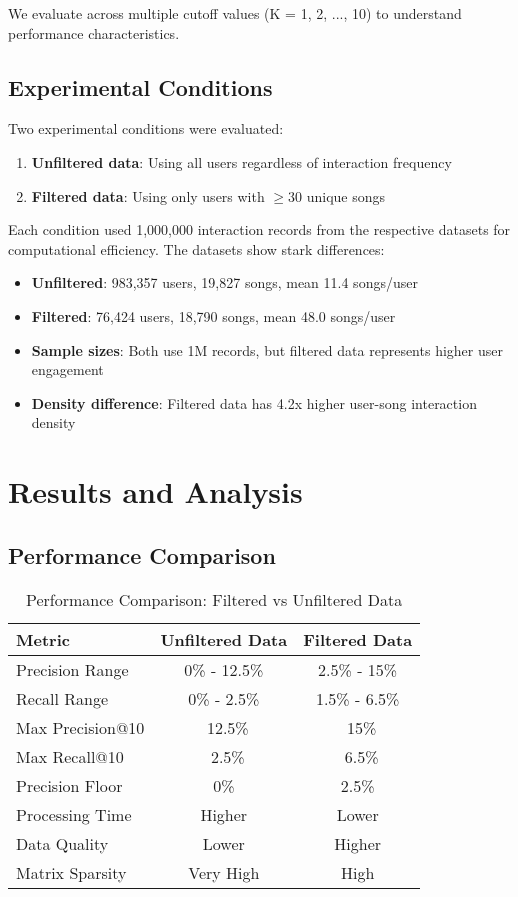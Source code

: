 \documentclass[12pt,a4paper]{article}
\begin{document}
We evaluate across multiple cutoff values (K = 1, 2, ..., 10) to understand performance characteristics.

\subsection{Experimental Conditions}
Two experimental conditions were evaluated:
\begin{enumerate}
    \item \textbf{Unfiltered data}: Using all users regardless of interaction frequency
    \item \textbf{Filtered data}: Using only users with $\geq 30$ unique songs
\end{enumerate}

Each condition used 1,000,000 interaction records from the respective datasets for computational efficiency. The datasets show stark differences:

\begin{itemize}
    \item \textbf{Unfiltered}: 983,357 users, 19,827 songs, mean 11.4 songs/user
    \item \textbf{Filtered}: 76,424 users, 18,790 songs, mean 48.0 songs/user
    \item \textbf{Sample sizes}: Both use 1M records, but filtered data represents higher user engagement
    \item \textbf{Density difference}: Filtered data has 4.2x higher user-song interaction density
\end{itemize}

\section{Results and Analysis}

\subsection{Performance Comparison}

\begin{table}[H]
\centering
\caption{Performance Comparison: Filtered vs Unfiltered Data}
\begin{tabular}{lcc}
\toprule
Metric & Unfiltered Data & Filtered Data \\
\midrule
Precision Range & 0\% - 12.5\% & 2.5\% - 15\% \\
Recall Range & 0\% - 2.5\% & 1.5\% - 6.5\% \\
Max Precision@10 & ~12.5\% & ~15\% \\
Max Recall@10 & ~2.5\% & ~6.5\% \\
Precision Floor & 0\% & 2.5\% \\
Processing Time & Higher & Lower \\
Data Quality & Lower & Higher \\
Matrix Sparsity & Very High & High \\
\bottomrule
\end{tabular}
\end{table}
\end{document}
